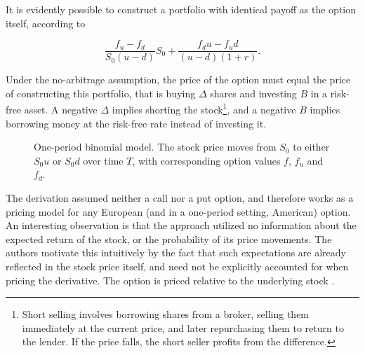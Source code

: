\documentclass[english,12pt,a4paper,pdftex,sci,utf8]{aaltothesis}
\begin{document}
It is evidently possible to construct a portfolio with identical payoff as the option itself, according to

\begin{equation}
     \frac{f_u - f_d}{S_0(u-d)} S_0 + \frac{f_du-f_ud}{(u-d)(1+r)}
\label{eq:replicating-portfolio}.
\end{equation}

Under the no-arbitrage assumption, the price of the option must equal the price of constructing this portfolio, that is buying $\Delta$ shares and investing $B$ in a risk-free asset. A negative $\Delta$ implies shorting the stock\footnote{Short selling involves borrowing shares from a broker, selling them immediately at the current price, and later repurchasing them to return to the lender. If the price falls, the short seller profits from the difference.}, and a negative $B$ implies borrowing money at the risk-free rate instead of investing it.
\begin{figure}[htbp]
    \centering
    \caption{One-period binomial model. The stock price moves from $S_0$ to either $S_0u$ or $S_0d$ over time $T$, with corresponding option values $f$, $f_u$ and $f_d$.}
    \label{fig:oneperiodbinom}
\end{figure}

The derivation assumed neither a call nor a put option, and therefore works as a pricing model for any European (and in a one-period setting, American) option. An interesting observation is that the approach utilized no information about the expected return of the stock, or the probability of its price movements. The authors motivate this intuitively by the fact that such expectations are already reflected in the stock price itself, and need not be explicitly accounted for when pricing the derivative. The option is priced relative to the underlying stock \cite{hull2016options}.\clearpage
\end{document}
